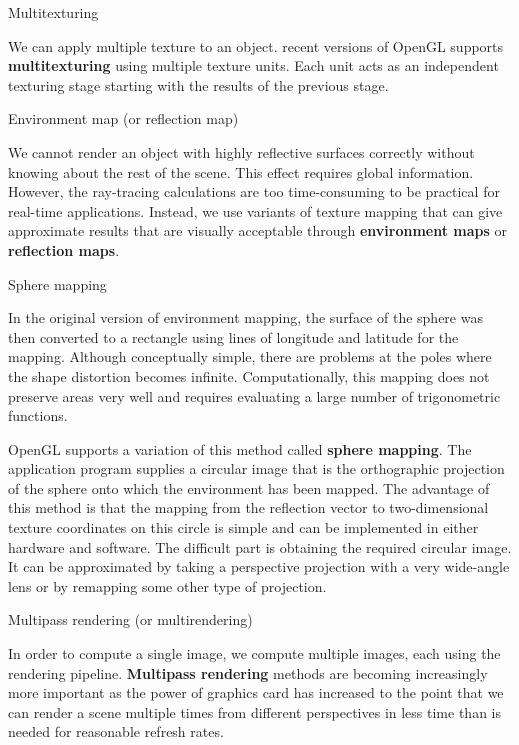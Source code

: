 \documentclass[10pt,a4paper]{article}
\begin{document}
\begin{enumerate}
		{\large \item Multitexturing}
		
		We can apply multiple texture to an object. recent versions of OpenGL supports \textbf{multitexturing} using multiple texture units. Each unit acts as an independent texturing stage starting with the results of the previous stage.\\
		
		{\large \item Environment map (or reflection map)}
		
		We cannot render an object with highly reflective surfaces correctly without knowing about the rest of the scene. This effect requires global information. However, the ray-tracing calculations are too time-consuming to be practical for real-time applications. Instead, we use variants of texture mapping that can give approximate results that are visually acceptable through \textbf{environment maps} or \textbf{reflection maps}.\\
		
		{\large \item Sphere mapping}
		
		In the original version of environment mapping, the surface of the sphere was then converted to a rectangle using lines of longitude and latitude for the mapping. Although conceptually simple, there are problems at the poles where the shape distortion becomes infinite. Computationally, this mapping does not preserve areas very well and requires evaluating a large number of trigonometric functions.
		
		OpenGL supports a variation of this method called \textbf{sphere mapping}. The application program supplies a circular image that is the orthographic projection of the sphere onto which the environment has been mapped. The advantage of this method is that the mapping from the reflection vector to two-dimensional texture coordinates on this circle is simple and can be implemented in either hardware and software. The difficult part is obtaining the required circular image. It can be approximated by taking a perspective projection with a very wide-angle lens or by remapping some other type of projection.\\
		
		{\large \item Multipass rendering (or multirendering)}
		
		In order to compute a single image, we compute multiple images, each using the rendering pipeline. \textbf{Multipass rendering} methods are becoming increasingly more important as the power of graphics card has increased to the point that we can render a scene multiple times from different perspectives in less time than is needed for reasonable refresh rates.\\
		

\end{enumerate}
\end{document}
